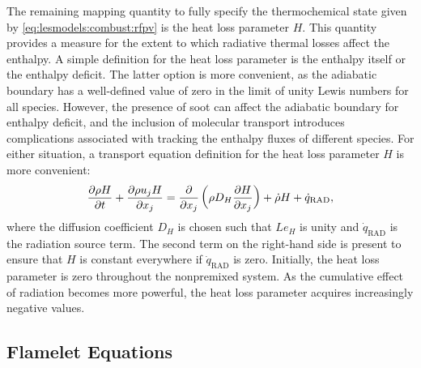 The remaining mapping quantity to fully specify the thermochemical state given by \cref{eq:lesmodels:combust:rfpv} is the heat loss parameter $H$. This quantity provides a measure for the extent to which radiative thermal losses affect the enthalpy. A simple definition for the heat loss parameter is the enthalpy itself or the enthalpy deficit. The latter option is more convenient, as the adiabatic boundary has a well-defined value of zero in the limit of unity Lewis numbers for all species. However, the presence of soot can affect the adiabatic boundary for enthalpy deficit, and the inclusion of molecular transport introduces complications associated with tracking the enthalpy fluxes of different species. For either situation, a transport equation definition for the heat loss parameter $H$ is more convenient:
\begin{equation}\label{eq:lesmodels:combust:map:heatloss}
  \trder{H} = \pder[]{x_j}\left( \rho D_H \pder[H]{x_j} \right) + \dot{\rho}H + \dot{q}_{\text{RAD}},
\end{equation}
where the diffusion coefficient $D_H$ is chosen such that $Le_H$ is unity and $\dot{q}_{\text{RAD}}$ is the radiation source term. The second term on the right-hand side is present to ensure that $H$ is constant everywhere if $\dot{q}_{\text{RAD}}$ is zero. Initially, the heat loss parameter is zero throughout the nonpremixed system. As the cumulative effect of radiation becomes more powerful, the heat loss parameter acquires increasingly negative values.


\subsection{Flamelet Equations}
\label{sec:lesmodels:combust:flamelet}

